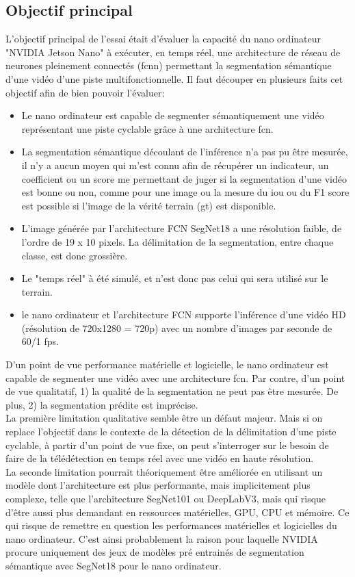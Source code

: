 ﻿\subsection{Objectif principal}
\noindent L'objectif principal de l'essai était d'évaluer la capacité du nano ordinateur "NVIDIA Jetson Nano" à exécuter, en temps réel, une architecture de réseau de neurones pleinement connectés (\acrshort{fcnn}) permettant la segmentation sémantique d'une vidéo d'une piste multifonctionnelle. Il faut découper en plusieurs faits cet objectif afin de bien pouvoir l'évaluer: 
\begin{itemize}
   \item Le nano ordinateur est capable de segmenter sémantiquement une vidéo représentant une piste cyclable grâce à une architecture \acrshort{fcn}. 
   \item La segmentation sémantique découlant de l'inférence n'a pas pu être mesurée, il n'y a aucun moyen qui m'est connu afin de récupérer un indicateur, un coefficient ou un score me permettant de juger si la segmentation d'une vidéo est bonne ou non, comme pour une image ou la mesure du \acrshort{iou} ou du F1 score est possible si l'image de la vérité terrain (\acrshort{gt}) est disponible. 
   \item L'image générée par l'architecture FCN SegNet18 a une résolution faible, de l'ordre de 19 x 10 pixels. La délimitation de la segmentation, entre chaque classe, est donc grossière.
   \item Le "temps réel" à été simulé, et n'est donc pas celui qui sera utilisé sur le terrain. 
   \item le nano ordinateur et l'architecture FCN supporte l'inférence d'une vidéo HD (résolution de 720x1280 = 720p) avec un nombre d'images par seconde de 60/1 \acrshort{fps}.
\end{itemize}
\vspace{\baselineskip}
\noindent D'un point de vue performance matérielle et logicielle, le nano ordinateur est capable de segmenter une vidéo avec une architecture \acrshort{fcn}. Par contre, d'un point de vue qualitatif, 1) la qualité de la segmentation ne peut pas être mesurée. De plus, 2) la segmentation prédite est imprécise.
\vspace{\baselineskip}
\\
\noindent La première limitation qualitative semble être un défaut majeur. Mais si on replace l'objectif dans le contexte de la détection de la délimitation d'une piste cyclable, à partir d'un point de vue fixe, on peut s'interroger sur le besoin de faire de la télédétection en temps réel avec une vidéo en haute résolution.
\vspace{\baselineskip}
\\
\noindent La seconde limitation pourrait théoriquement être améliorée en utilisant un modèle dont l'architecture est plus performante, mais implicitement plus complexe, telle que l'architecture SegNet101 ou DeepLabV3, mais qui risque d'être aussi plus demandant en ressources matérielles, GPU, CPU et mémoire. Ce qui risque de remettre en question les performances matérielles et logicielles du nano ordinateur. C'est ainsi probablement la raison pour laquelle NVIDIA procure uniquement des jeux de modèles pré entrainés de segmentation sémantique avec SegNet18 pour le nano ordinateur. 
